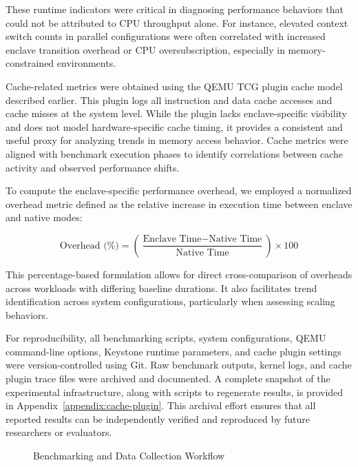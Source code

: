 These runtime indicators were critical in diagnosing performance behaviors that could not be attributed to CPU throughput alone. For instance, elevated context switch counts in parallel configurations were often correlated with increased enclave transition overhead or CPU oversubscription, especially in memory-constrained environments.

Cache-related metrics were obtained using the QEMU TCG plugin cache model described earlier. This plugin logs all instruction and data cache accesses and cache misses at the system level. While the plugin lacks enclave-specific visibility and does not model hardware-specific cache timing, it provides a consistent and useful proxy for analyzing trends in memory access behavior. Cache metrics were aligned with benchmark execution phases to identify correlations between cache activity and observed performance shifts.

To compute the enclave-specific performance overhead, we employed a normalized overhead metric defined as the relative increase in execution time between enclave and native modes:

\[
\text{Overhead (\%)} = \left( \frac{\text{Enclave Time} - \text{Native Time}}{\text{Native Time}} \right) \times 100
\]

This percentage-based formulation allows for direct cross-comparison of overheads across workloads with differing baseline durations. It also facilitates trend identification across system configurations, particularly when assessing scaling behaviors.

For reproducibility, all benchmarking scripts, system configurations, QEMU command-line options, Keystone runtime parameters, and cache plugin settings were version-controlled using Git. Raw benchmark outputs, kernel logs, and cache plugin trace files were archived and documented. A complete snapshot of the experimental infrastructure, along with scripts to regenerate results, is provided in Appendix~\ref{appendix:cache-plugin}. This archival effort ensures that all reported results can be independently verified and reproduced by future researchers or evaluators.

\begin{figure}[H]
\centering
{}
\caption{Benchmarking and Data Collection Workflow}
\label{fig:benchmarking-workflow}
\end{figure}

